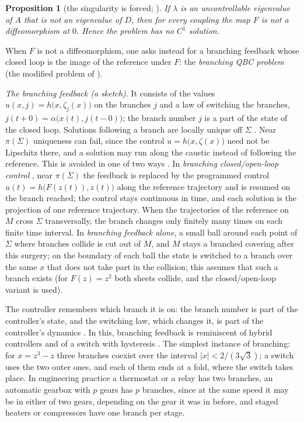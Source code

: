 \documentclass[11pt,reqno]{amsart}
\theoremstyle{plain}
\newtheorem*{proposition}{Proposition}
\theoremstyle{remark}
\theoremstyle{definition}
\newcommand{\Sig}{\Sigma}
\begin{document}
\begin{proposition}[the singularity is forced; {\cite[Cor.~2.7]{Shosh1990}}]
If $\lambda$ is an uncontrollable eigenvalue of $A$ that is not an eigenvalue of $D$, then for every coupling the
map $F$ is not a diffeomorphism at $0$. Hence the problem has no $C^{1}$ solution.
\end{proposition}

When $F$ is not a diffeomorphism, one asks instead for a branching feedback whose closed loop is the image of the
reference under $F$: the \emph{branching QBC problem} (the modified problem of \cite[\S3]{Shosh1990}).

 \emph{The branching feedback (a sketch).} It consists of the values $u(x,j)=h\bigl(x,\zeta_j(x)\bigr)$ on the branches $j$ and a law of switching the branches, $j(t+0)=\alpha\bigl(x(t),j(t-0)\bigr)$; the branch number $j$ is a part of the state of the closed loop. Solutions following a branch are locally unique off $\Sig$ \cite[Prop.~3.1]{Shosh1990}.
Near $\pi(\Sig)$ uniqueness can fail, since the control $u=h\bigl(x,\zeta(x)\bigr)$ need not be Lipschitz there, and a solution may run along the caustic instead of following the reference.
This is avoided in one of two ways \cite[\S2.5]{Companion}. In \emph{branching closed/open-loop control}
\cite[\S3]{Shosh1990}, near $\pi(\Sig)$ the feedback is replaced by the programmed control $u(t)=h\bigl(F(z(t)),z(t)\bigr)$ along the
reference trajectory and is resumed on the branch reached; the control stays continuous in time, and each
solution is the projection of one reference trajectory. When the trajectories of the reference on $M$ cross $\Sig$ transversally, the branch changes only finitely many times on each finite time interval. In \emph{branching feedback alone}, a small ball around
each point of $\Sig$ where branches collide is cut out of $M$, and $M$ stays a branched covering after
this surgery; on the boundary of each ball the state is switched to a branch over the same $x$ that does not take
part in the collision; this assumes that such a branch exists (for $F(z)=z^{2}$ both sheets collide, and the
closed/open-loop variant is used).

The controller remembers which branch it is on: the branch number is part of the controller's state, and the switching law, which changes it, is part of the controller's dynamics \cite{Shosh1990,Sontag1999}. In this, branching feedback is reminiscent of hybrid controllers
\cite{GoebelSanfeliceTeel2012,Sanfelice2021} and of a switch with hysteresis \cite{KrasnoselskiiPokrovskii1989,Visintin2014}. The simplest instance of branching: for $x=z^{3}-z$ three
branches coexist over the interval $|x|<2/(3\sqrt3)$; a switch uses the two outer ones, and each of them ends at a fold,
where the switch takes place. In engineering practice a thermostat or a
relay has two branches, an automatic gearbox with $p$ gears has $p$ branches, since at the same speed it may be in either of two gears, depending on the gear it was in before, and staged heaters or compressors have one branch per stage.
\end{document}
